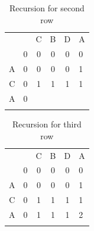 \documentclass[a4paper,11pt]{book}
\begin{document}
\begin{table}[ht]
\centering
\begin{tabular}{cccccl}
                       &                        & C                      & B                      & D                      & A                      \\ \cline{2-6} 
\multicolumn{1}{c|}{}  & \multicolumn{1}{c|}{0} & \multicolumn{1}{c|}{0} & \multicolumn{1}{c|}{0} & \multicolumn{1}{c|}{0} & \multicolumn{1}{l|}{0} \\ \cline{2-6} 
\multicolumn{1}{c|}{A} & \multicolumn{1}{c|}{0} & \multicolumn{1}{c|}{0} & \multicolumn{1}{c|}{0} & \multicolumn{1}{c|}{0} & \multicolumn{1}{l|}{1} \\ \cline{2-6} 
\multicolumn{1}{c|}{C} & \multicolumn{1}{c|}{0} & \multicolumn{1}{c|}{1} & \multicolumn{1}{c|}{1} & \multicolumn{1}{c|}{1} & \multicolumn{1}{l|}{1} \\ \cline{2-6} 
\multicolumn{1}{c|}{A} & \multicolumn{1}{c|}{0} & \multicolumn{1}{c|}{}  & \multicolumn{1}{c|}{}  & \multicolumn{1}{c|}{}  & \multicolumn{1}{l|}{}  \\ \cline{2-6} 
\multicolumn{1}{l}{}   & \multicolumn{1}{l}{}   & \multicolumn{1}{l}{}   & \multicolumn{1}{l}{}   & \multicolumn{1}{l}{}   &                       
\end{tabular}
\caption*{Recursion for second row}
\end{table}

\begin{table}[ht]
\centering
\begin{tabular}{cccccl}
                       &                        & C                      & B                      & D                      & A                      \\ \cline{2-6} 
\multicolumn{1}{c|}{}  & \multicolumn{1}{c|}{0} & \multicolumn{1}{c|}{0} & \multicolumn{1}{c|}{0} & \multicolumn{1}{c|}{0} & \multicolumn{1}{l|}{0} \\ \cline{2-6} 
\multicolumn{1}{c|}{A} & \multicolumn{1}{c|}{0} & \multicolumn{1}{c|}{0} & \multicolumn{1}{c|}{0} & \multicolumn{1}{c|}{0} & \multicolumn{1}{l|}{1} \\ \cline{2-6} 
\multicolumn{1}{c|}{C} & \multicolumn{1}{c|}{0} & \multicolumn{1}{c|}{1} & \multicolumn{1}{c|}{1} & \multicolumn{1}{c|}{1} & \multicolumn{1}{l|}{1} \\ \cline{2-6} 
\multicolumn{1}{c|}{A} & \multicolumn{1}{c|}{0} & \multicolumn{1}{c|}{1} & \multicolumn{1}{c|}{1} & \multicolumn{1}{c|}{1} & \multicolumn{1}{l|}{2} \\ \cline{2-6} 
\multicolumn{1}{l}{}   & \multicolumn{1}{l}{}   & \multicolumn{1}{l}{}   & \multicolumn{1}{l}{}   & \multicolumn{1}{l}{}   &                       
\end{tabular}
\caption*{Recursion for third row}
\end{table}
\end{document}
